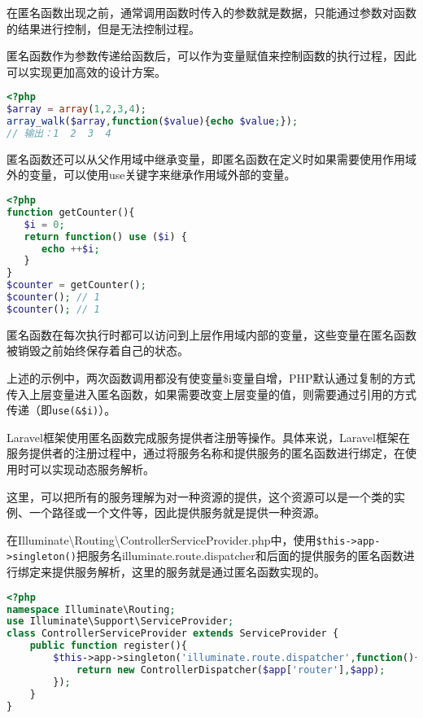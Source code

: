 在匿名函数出现之前，通常调用函数时传入的参数就是数据，只能通过参数对函数的结果进行控制，但是无法控制过程。

匿名函数作为参数传递给函数后，可以作为变量赋值来控制函数的执行过程，因此可以实现更加高效的设计方案。



\begin{lstlisting}[language=PHP]
<?php
$array = array(1,2,3,4);
array_walk($array,function($value){echo $value;});
// 输出：1  2  3  4
\end{lstlisting}

匿名函数还可以从父作用域中继承变量，即匿名函数在定义时如果需要使用作用域外的变量，可以使用use关键字来继承作用域外部的变量。

\begin{lstlisting}[language=PHP]
<?php
function getCounter(){
   $i = 0;
   return function() use ($i) {
      echo ++$i;
   }
}
$counter = getCounter();
$counter(); // 1
$counter(); // 1
\end{lstlisting}

匿名函数在每次执行时都可以访问到上层作用域内部的变量，这些变量在匿名函数被销毁之前始终保存着自己的状态。

上述的示例中，两次函数调用都没有使变量\$i变量自增，PHP默认通过复制的方式传入上层变量进入匿名函数，如果需要改变上层变量的值，则需要通过引用的方式传递（即\texttt{use(\&\$i)}）。

Laravel框架使用匿名函数完成服务提供者注册等操作。具体来说，Laravel框架在服务提供者的注册过程中，通过将服务名称和提供服务的匿名函数进行绑定，在使用时可以实现动态服务解析。

这里，可以把所有的服务理解为对一种资源的提供，这个资源可以是一个类的实例、一个路径或一个文件等，因此提供服务就是提供一种资源。

在Illuminate\textbackslash Routing\textbackslash ControllerServiceProvider.php中，使用\texttt{\$this->app->singleton()}把服务名illuminate.route.dispatcher和后面的提供服务的匿名函数进行绑定来提供服务解析，这里的服务就是通过匿名函数实现的。


\begin{lstlisting}[language=PHP]
<?php
namespace Illuminate\Routing;
use Illuminate\Support\ServiceProvider;
class ControllerServiceProvider extends ServiceProvider {
    public function register(){
        $this->app->singleton('illuminate.route.dispatcher',function(){
            return new ControllerDispatcher($app['router'],$app);
        });
    }
}
\end{lstlisting}


